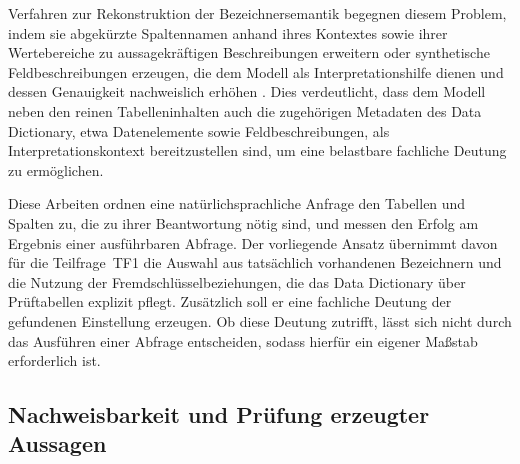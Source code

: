 Verfahren zur Rekonstruktion der Bezeichnersemantik begegnen diesem Problem, indem sie abgekürzte Spaltennamen anhand ihres Kontextes sowie ihrer Wertebereiche zu aussagekräftigen Beschreibungen erweitern \cite{cai_columbo_2025} oder synthetische Feldbeschreibungen erzeugen, die dem Modell als Interpretationshilfe dienen und dessen Genauigkeit nachweislich erhöhen \cite{wretblad_synthetic_2024}. Dies verdeutlicht, dass dem Modell neben den reinen Tabelleninhalten auch die zugehörigen Metadaten des Data Dictionary, etwa Datenelemente sowie Feldbeschreibungen, als Interpretationskontext bereitzustellen sind, um eine belastbare fachliche Deutung zu ermöglichen.

Diese Arbeiten ordnen eine natürlichsprachliche Anfrage den Tabellen und Spalten zu, die zu ihrer Beantwortung nötig sind, und messen den Erfolg am Ergebnis einer ausführbaren Abfrage. Der vorliegende Ansatz übernimmt davon für die Teilfrage~TF1 die Auswahl aus tatsächlich vorhandenen Bezeichnern und die Nutzung der Fremdschlüsselbeziehungen, die das Data Dictionary über Prüftabellen explizit pflegt. Zusätzlich soll er eine fachliche Deutung der gefundenen Einstellung erzeugen. Ob diese Deutung zutrifft, lässt sich nicht durch das Ausführen einer Abfrage entscheiden, sodass hierfür ein eigener Maßstab erforderlich ist.

\subsection{Nachweisbarkeit und Prüfung erzeugter Aussagen}
\label{subsec:rw-verifikation}

